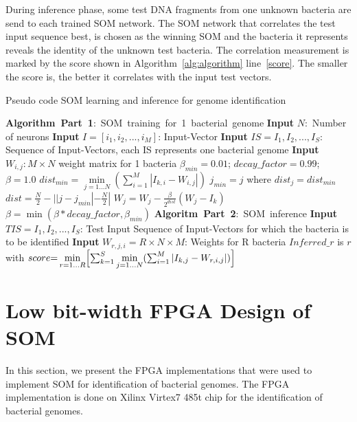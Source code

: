 During inference phase, some test DNA fragments from one unknown bacteria are send to each trained SOM network. The SOM network that correlates the test input sequence best, is chosen as the winning SOM and the bacteria it represents reveals the identity of the unknown test bacteria. The correlation measurement is marked by the score shown in Algorithm~\ref{alg:algorithm} line~\ref{score}. The smaller the score is, the better it correlates with the input test vectors.
\begin{algorithm}[htb]
	 \caption{Pseudo code SOM learning and inference for genome identification}
	\label{alg:algorithm}
	\begin{algorithmic}[1]\label{Algo:SOMTraining}
		\Statex \mbox{\textbf{Algorithm Part 1}: SOM training for 1 bacterial genome}
		\State \textbf{Input} $N:$ Number of neurons
		\State \textbf{Input} $I{=}[i_1, i_2, ..., i_M]$: Input-Vector
       	\State \textbf{Input} $IS{=}{I_1, I_2, ..., I_S}$: Sequence of Input-Vectors, each IS represents one bacterial genome \label{IS_Def}
       	\State \textbf{Input} $W_{i,j}: M\times N$ weight matrix for 1 bacteria
        \State $\beta_{min}=0.01$; $decay\_factor=0.99$; $\beta=1.0$\label{beta_init}
		\State $dist_{min}=\min\limits_{j=1...N}(\sum_{i=1}^{M}|I_{k,i}-W_{i,j}|)$\label{dist_min}
        \State $j_{min} = j$ where $dist_{j} = dist_{min}$\label{j_min}
           \State $dist = \frac{N}{2} - ||j-j_{min}|-\frac{N}{2}|$\label{dist_update} 
           \State $W_j = W_j - \frac{\beta}{2^{dist}}(W_j-I_k)$\label{W_update}
        \EndFor
        \State $\beta = \min(\beta*decay\_factor, \beta_{min})$\label{beta_update}
		\EndFor
  \Statex
   \mbox{\textbf{Algoritm Part 2}: SOM inference}
    \State \textbf{Input} $TIS{=}{I_1, I_2, ..., I_S}$: Test Input Sequence of Input-Vectors for which the bacteria is to be identified
    \State \textbf{Input} $W_{r,j,i}{=}R\times N \times M$: Weights for R bacteria
    \State $Inferred\_r$ is $r$ with\label{inferred_r}
    \State $score{=}\min\limits_{r=1...R}\Bigl[\sum_{k=1}^{S}\min\limits_{j=1...N}(\sum_{i=1}^{M} |I_{k,j}-W_{r,i,j}|)\Bigr]$\label{score}
	\end{algorithmic}
\end{algorithm}
\section{Low bit-width FPGA Design of SOM}\label{custom}
In this section, we present the FPGA implementations that were used to implement SOM for identification of bacterial genomes. The FPGA implementation is done on Xilinx Virtex7 485t chip for the identification of bacterial genomes. 

